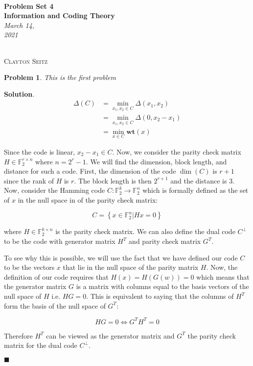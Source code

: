 \documentclass[12pt]{article}
\newtheorem{p}{Problem}[section]
\theoremstyle{definition}
\newenvironment{s}{%
        \begin{trivlist} \item \textbf{Solution}. }{%
            \hspace*{\fill} $\blacksquare$\end{trivlist}}%
\begin{document}
{\noindent\Huge\bf  \\[0.5\baselineskip] {\selectfont  Problem Set 4}         }\\[2\baselineskip] %
{ {\bf {}\selectfont Information and Coding Theory}\\ {\textit{\selectfont     March 14, 2021}}}~~~~~~~~~~~~~~~~~~~~~~~~~~~~~~~~~~~~~~~~~~~~~~~~~~~~~~~~~~~~~~~~~~~~~~~~~~~~~    {\large \textsc{Clayton Seitz}
\\[1.4\baselineskip] 

\begin{p}
This is the first problem
\end{p}

\begin{s}
\begin{align*}
\Delta(C) &= \min_{x_{1},x_{2}\in C} \Delta(x_{1},x_{2})\\
&= \min_{x_{1},x_{2}\in C} \Delta(0,x_{2}-x_{1})\\
&= \min_{x\in C} \mathbf{wt}(x)
\end{align*}

Since the code is linear, $x_{2}-x_{1} \in C$. Now, we consider the parity check matrix $H \in \mathbb{F}_{2}^{r\times n}$ where $n = 2^{r} - 1$. We will find the dimension, block length, and distance for such a code. First, the dimension of the code $\dim(C)$ is $r+1$ since the rank of $H$ is $r$. The block length is then $2^{r+1}$ and the distance is 3. Now, consider the Hamming code $C: \mathbb{F}_{2}^{k} \rightarrow \mathbb{F}_{2}^{n}$ which is formally defined as the set of $x$ in the null space in of the parity check matrix:

\begin{equation*}
C = \left\{x\in \mathbb{F}_{2}^{n} | Hx = 0\right\}
\end{equation*}

where $H \in \mathbb{F}_{2}^{k\times n}$ is the parity check matrix. We can also define the dual code $C^{\perp}$ to be the code with generator matrix $H^{T}$ and  parity check matrix $G^{T}$. 

To see why this is possible, we will use the fact that we have defined our code $C$ to be the vectors $x$ that lie in the null space of the parity matrix $H$. Now, the definition of our code requires that $H(x)=H(G(w))=0$ which means that the generator matrix $G$ is a matrix with columns equal to the basis vectors of the null space of $H$ i.e. $HG = 0$. This is equivalent to saying that the columns of $H^{T}$ form the basis of the null space of $G^{T}$:

\begin{equation*}
HG = 0 \iff G^{T}H^{T}=0
\end{equation*}

Therefore $H^{T}$ can be viewed as the generator matrix and $G^{T}$ the parity check matrix for the dual code $C^{\perp}$.

\end{s}
\end{document}
